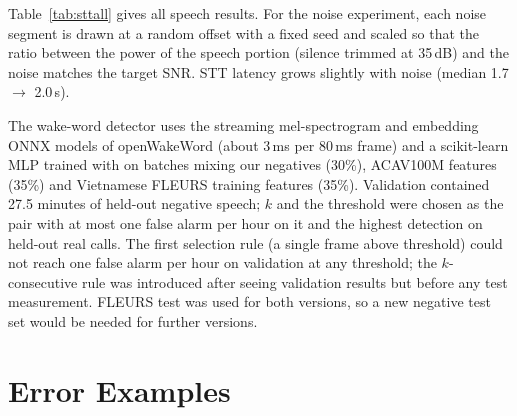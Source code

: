 \begin{table}[t]
\centering\footnotesize
\setlength{\tabcolsep}{3pt}
\caption{End-to-end correct commands per recognizer and set (v6.1 seed 42, q4, threshold 0.80; set A row after the
normalization fix). WER of PhoWhisper-small: A 17.9\%, B 20.2\%, C 23.0\%, D 20.9\%.}
\label{tab:sttall}
\end{table}

Table~\ref{tab:sttall} gives all speech results. For the noise experiment, each noise segment is drawn at a random offset with a
fixed seed and scaled so that the ratio between the power of the speech portion (silence trimmed at 35\,dB) and the noise
matches the target SNR. STT latency grows slightly with noise (median 1.7 $\rightarrow$ 2.0\,s).

The wake-word detector uses the streaming mel-spectrogram and embedding ONNX models of openWakeWord (about 3\,ms per 80\,ms
frame) and a scikit-learn MLP trained with  on batches mixing our negatives (30\%), ACAV100M features (35\%)
and Vietnamese FLEURS training features (35\%). Validation contained 27.5 minutes of held-out negative speech; $k$ and the
threshold were chosen as the pair with at most one false alarm per hour on it and the highest detection on held-out real calls.
The first selection rule (a single frame above threshold) could not reach one false alarm per hour on validation at any threshold;
the $k$-consecutive rule was introduced after seeing validation results but before any test measurement. FLEURS test was used
for both versions, so a new negative test set would be needed for further versions.

\section{Error Examples}
\label{app:errors}

